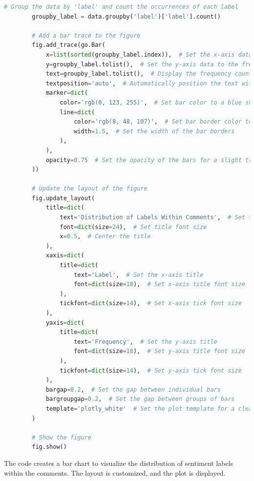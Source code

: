 \documentclass{solutionclass} %
\begin{document}
\begin{solution}
\begin{lstlisting}[language=Python, basicstyle=\ttfamily\footnotesize, keywordstyle=\color{blue}, commentstyle=\color{gray}]
        # Group the data by 'label' and count the occurrences of each label
        groupby_label = data.groupby('label')['label'].count()
        
        # Add a bar trace to the figure
        fig.add_trace(go.Bar(
            x=list(sorted(groupby_label.index)),  # Set the x-axis data to the sorted unique labels
            y=groupby_label.tolist(),  # Set the y-axis data to the frequency counts of each label
            text=groupby_label.tolist(),  # Display the frequency counts as text on the bars
            textposition='auto',  # Automatically position the text within the bars
            marker=dict(
                color='rgb(0, 123, 255)',  # Set bar color to a blue shade
                line=dict(
                    color='rgb(8, 48, 107)',  # Set bar border color to a darker blue
                    width=1.5,  # Set the width of the bar borders
                ),
            ),
            opacity=0.75  # Set the opacity of the bars for a slight transparency effect
        ))
        
        # Update the layout of the figure
        fig.update_layout(
            title=dict(
                text='Distribution of Labels Within Comments',  # Set the title of the plot
                font=dict(size=24),  # Set title font size
                x=0.5,  # Center the title
            ),
            xaxis=dict(
                title=dict(
                    text='Label',  # Set the x-axis title
                    font=dict(size=18),  # Set x-axis title font size
                ),
                tickfont=dict(size=14),  # Set x-axis tick font size
            ),
            yaxis=dict(
                title=dict(
                    text='Frequency',  # Set the y-axis title
                    font=dict(size=18),  # Set y-axis title font size
                ),
                tickfont=dict(size=14),  # Set y-axis tick font size
            ),
            bargap=0.2,  # Set the gap between individual bars
            bargroupgap=0.2,  # Set the gap between groups of bars
            template='plotly_white'  # Set the plot template for a cleaner look
        )
        
        # Show the figure
        fig.show()
        \end{lstlisting}
        
        The code creates a bar chart to visualize the distribution of sentiment labels within the comments. The layout is customized, and the plot is displayed.
        

\end{solution}
\end{document}

